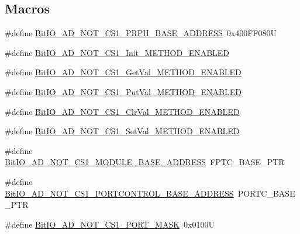 \subsection*{Macros}
\begin{DoxyCompactItemize}
\item 
\#define \hyperlink{group___bit_i_o___a_d___n_o_t___c_s1__module_gacd61787872c05fab769dab859faf3b47}{Bit\-I\-O\-\_\-\-A\-D\-\_\-\-N\-O\-T\-\_\-\-C\-S1\-\_\-\-P\-R\-P\-H\-\_\-\-B\-A\-S\-E\-\_\-\-A\-D\-D\-R\-E\-S\-S}~0x400\-F\-F080\-U
\item 
\#define \hyperlink{group___bit_i_o___a_d___n_o_t___c_s1__module_gaf2888ce8a6f76fb404997b5da340f56e}{Bit\-I\-O\-\_\-\-A\-D\-\_\-\-N\-O\-T\-\_\-\-C\-S1\-\_\-\-Init\-\_\-\-M\-E\-T\-H\-O\-D\-\_\-\-E\-N\-A\-B\-L\-E\-D}
\item 
\#define \hyperlink{group___bit_i_o___a_d___n_o_t___c_s1__module_ga4a784cdfb8b6be4889a77cbe62ac4804}{Bit\-I\-O\-\_\-\-A\-D\-\_\-\-N\-O\-T\-\_\-\-C\-S1\-\_\-\-Get\-Val\-\_\-\-M\-E\-T\-H\-O\-D\-\_\-\-E\-N\-A\-B\-L\-E\-D}
\item 
\#define \hyperlink{group___bit_i_o___a_d___n_o_t___c_s1__module_ga8c26a8a692228be4bf8b1e4c35cbc94e}{Bit\-I\-O\-\_\-\-A\-D\-\_\-\-N\-O\-T\-\_\-\-C\-S1\-\_\-\-Put\-Val\-\_\-\-M\-E\-T\-H\-O\-D\-\_\-\-E\-N\-A\-B\-L\-E\-D}
\item 
\#define \hyperlink{group___bit_i_o___a_d___n_o_t___c_s1__module_ga10b0bc57ca07fbba1470a48e02c81645}{Bit\-I\-O\-\_\-\-A\-D\-\_\-\-N\-O\-T\-\_\-\-C\-S1\-\_\-\-Clr\-Val\-\_\-\-M\-E\-T\-H\-O\-D\-\_\-\-E\-N\-A\-B\-L\-E\-D}
\item 
\#define \hyperlink{group___bit_i_o___a_d___n_o_t___c_s1__module_ga028dd36f90843a2d60f0b7e05b515e0a}{Bit\-I\-O\-\_\-\-A\-D\-\_\-\-N\-O\-T\-\_\-\-C\-S1\-\_\-\-Set\-Val\-\_\-\-M\-E\-T\-H\-O\-D\-\_\-\-E\-N\-A\-B\-L\-E\-D}
\item 
\#define \hyperlink{group___bit_i_o___a_d___n_o_t___c_s1__module_ga781b1c8ce0847709ae93bbb0581bba2b}{Bit\-I\-O\-\_\-\-A\-D\-\_\-\-N\-O\-T\-\_\-\-C\-S1\-\_\-\-M\-O\-D\-U\-L\-E\-\_\-\-B\-A\-S\-E\-\_\-\-A\-D\-D\-R\-E\-S\-S}~F\-P\-T\-C\-\_\-\-B\-A\-S\-E\-\_\-\-P\-T\-R
\item 
\#define \hyperlink{group___bit_i_o___a_d___n_o_t___c_s1__module_gaa464917636e1eb050f9891d06a2b6d65}{Bit\-I\-O\-\_\-\-A\-D\-\_\-\-N\-O\-T\-\_\-\-C\-S1\-\_\-\-P\-O\-R\-T\-C\-O\-N\-T\-R\-O\-L\-\_\-\-B\-A\-S\-E\-\_\-\-A\-D\-D\-R\-E\-S\-S}~P\-O\-R\-T\-C\-\_\-\-B\-A\-S\-E\-\_\-\-P\-T\-R
\item 
\#define \hyperlink{group___bit_i_o___a_d___n_o_t___c_s1__module_ga5a7cc721d5696c7acd433d75ac670cd5}{Bit\-I\-O\-\_\-\-A\-D\-\_\-\-N\-O\-T\-\_\-\-C\-S1\-\_\-\-P\-O\-R\-T\-\_\-\-M\-A\-S\-K}~0x0100\-U
\end{DoxyCompactItemize}
